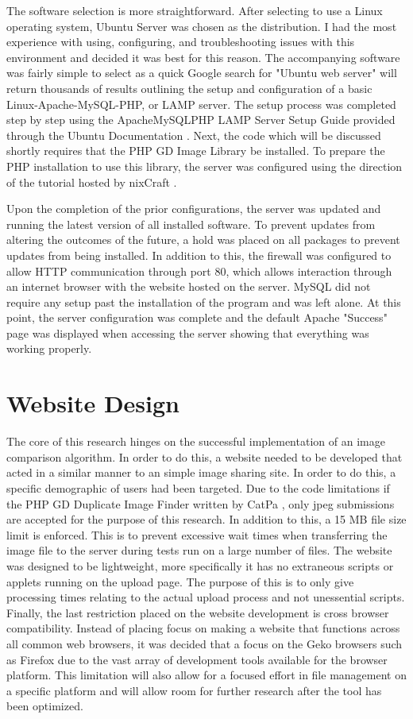 The software selection is more straightforward. After selecting to use a Linux operating system, Ubuntu Server was chosen as the distribution. I had the most experience with using, configuring, and troubleshooting issues with this environment and decided it was best for this reason. The accompanying software was fairly simple to select as a quick Google search for "Ubuntu web server" will return thousands of results outlining the setup and configuration of a basic Linux-Apache-MySQL-PHP, or LAMP server. The setup process was completed step by step using the ApacheMySQLPHP LAMP Server Setup Guide provided through the Ubuntu Documentation \cite{ubuntu:lampsetup}. Next, the code which will be discussed shortly requires that the PHP GD Image Library be installed. To prepare the PHP installation to use this library, the server was configured using the direction of the tutorial hosted by nixCraft \cite{nix:gdsetup}.

Upon the completion of the prior configurations, the server was updated and running the latest version of all installed software. To prevent updates from altering the outcomes of the future, a hold was placed on all packages to prevent updates from being installed. In addition to this, the firewall was configured to allow HTTP communication through port 80, which allows interaction through an internet browser with the website hosted on the server. MySQL did not require any setup past the installation of the program and was left alone. At this point, the server configuration was complete and the default Apache "Success" page was displayed when accessing the server showing that everything was working properly.

\section{Website Design}
The core of this research hinges on the successful implementation of an image comparison algorithm. In order to do this, a website needed to be developed that acted in a similar manner to an simple image sharing site. In order to do this, a specific demographic of users had been targeted. Due to the code limitations if the PHP GD Duplicate Image Finder written by CatPa \cite{catpa:gdcode}, only jpeg submissions are accepted for the purpose of this research. In addition to this, a 15 MB file size limit is enforced. This is to prevent excessive wait times when transferring the image file to the server during tests run on a large number of files. The website was designed to be lightweight, more specifically it has no extraneous scripts or applets running on the upload page. The purpose of this is to only give processing times relating to the actual upload process and not unessential scripts. Finally, the last restriction placed on the website development is cross browser compatibility. Instead of placing focus on making a website that functions across all common web browsers, it was decided that a focus on the Geko browsers such as Firefox due to the vast array of development tools available for the browser platform. This limitation will also allow for a focused effort in file management on a specific platform and will allow room for further research after the tool has been optimized.

